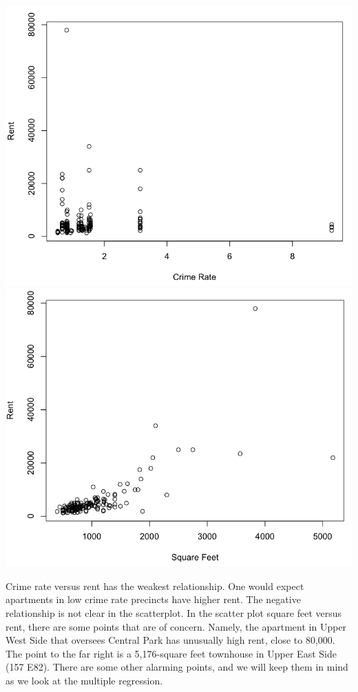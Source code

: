 \documentclass[a4 paper, 11 pt, twocolumn]{article}
\begin{document}
\begin{center}
\includegraphics[scale=0.3]{scatter3}
\includegraphics[scale=0.3]{scatter4}
\end{center}
Crime rate versus rent has the weakest relationship. One would expect apartments in low crime rate precincts have higher rent. The negative relationship is not clear in the scatterplot. In the scatter plot square feet versus rent, there are some points that are of concern. Namely, the apartment in Upper West Side that oversees Central Park has unusually high rent, close to 80,000. The point to the far right is a 5,176-square feet townhouse in Upper East Side (157 E82). There are some other alarming points, and we will keep them in mind as we look at the multiple regression.
\end{document}
